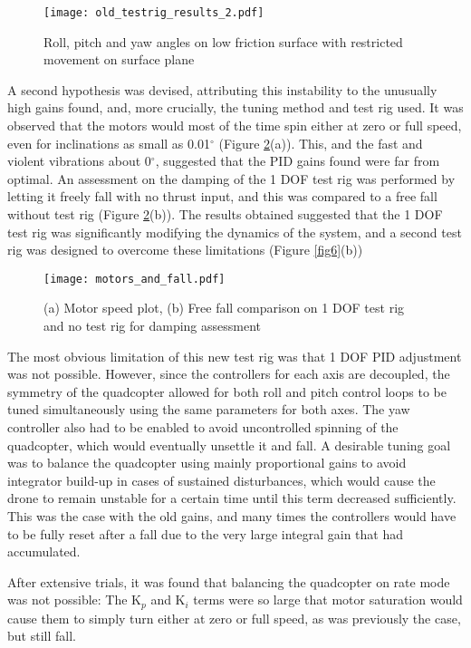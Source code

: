 \documentclass[12pt,a4paper]{article}
\begin{document}
\begin{figure}[h!]
\centering
 \texttt{[image: old\_testrig\_results\_2.pdf]}
  \caption{Roll, pitch and yaw angles on low friction surface with restricted movement on surface plane}
  \label{fig8}
\end{figure}

A second hypothesis was devised, attributing this instability to the unusually high gains found, and, more crucially, the tuning method and test rig used. It was observed that the motors would most of the time spin either at zero or full speed, even for inclinations as small as 0.01$^{\circ}$ (Figure \ref{fig9}(a)). This, and the fast and violent vibrations about 0$^{\circ}$, suggested that the PID gains found were far from optimal. An assessment on the damping of the 1 DOF test rig was performed by letting it freely fall with no thrust input, and this was compared to a free fall without test rig (Figure \ref{fig9}(b)). The results obtained suggested that the 1 DOF test rig was significantly modifying the dynamics of the system, and a second test rig was designed to overcome these limitations (Figure \ref{fig6}(b))


\begin{figure}[h!]
\centering
 \texttt{[image: motors\_and\_fall.pdf]}
  \caption{(a) Motor speed plot, (b) Free fall comparison on 1 DOF test rig and no test rig for damping assessment}
  \label{fig9}
\end{figure}

The most obvious limitation of this new test rig was that 1 DOF PID adjustment was not possible. However, since the controllers for each axis are decoupled, the symmetry of the quadcopter allowed for both roll and pitch control loops to be tuned simultaneously using the same parameters for both axes. The yaw controller also had to be enabled to avoid uncontrolled spinning of the quadcopter, which would eventually unsettle it and fall. A desirable tuning goal was to balance the quadcopter using mainly proportional gains to avoid integrator build-up in cases of sustained disturbances, which would cause the drone to remain unstable for a certain time until this term decreased sufficiently. This was the case with the old gains, and many times the controllers would have to be fully reset after a fall due to the very large integral gain that had accumulated.

After extensive trials, it was found that balancing the quadcopter on rate mode was not possible: The K$_p$ and K$_i$ terms were so large that motor saturation would cause them to simply turn either at zero or full speed, as was previously the case, but still fall. 
\end{document}
